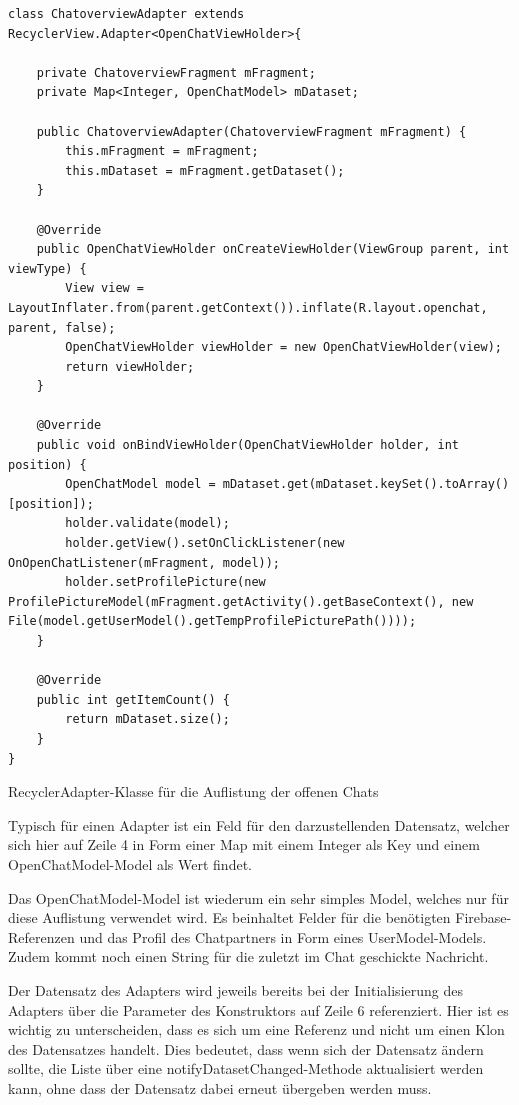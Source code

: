 \documentclass[../main.tex]{subfiles}
\begin{document}
\begin{code}
	\begin{center}
		\begin{verbatim}
class ChatoverviewAdapter extends RecyclerView.Adapter<OpenChatViewHolder>{

	private ChatoverviewFragment mFragment;
	private Map<Integer, OpenChatModel> mDataset;

	public ChatoverviewAdapter(ChatoverviewFragment mFragment) {
		this.mFragment = mFragment;
		this.mDataset = mFragment.getDataset();
	}

	@Override
	public OpenChatViewHolder onCreateViewHolder(ViewGroup parent, int viewType) {
		View view = LayoutInflater.from(parent.getContext()).inflate(R.layout.openchat, parent, false);
		OpenChatViewHolder viewHolder = new OpenChatViewHolder(view);
		return viewHolder;
	}

	@Override
	public void onBindViewHolder(OpenChatViewHolder holder, int position) {
		OpenChatModel model = mDataset.get(mDataset.keySet().toArray()[position]);
		holder.validate(model);
		holder.getView().setOnClickListener(new OnOpenChatListener(mFragment, model));
		holder.setProfilePicture(new ProfilePictureModel(mFragment.getActivity().getBaseContext(), new File(model.getUserModel().getTempProfilePicturePath())));
	}

	@Override
	public int getItemCount() {
		return mDataset.size();
	}
}
		\end{verbatim}
		\caption{RecyclerAdapter-Klasse für die Auflistung der offenen Chats}
		\label{chatOverviewAdapter}
	\end{center}
\end{code}

	Typisch für einen Adapter ist ein Feld für den darzustellenden Datensatz, welcher sich hier auf Zeile 4 in Form einer Map mit einem Integer als Key und einem OpenChatModel-Model als Wert findet. 
	
	Das OpenChatModel-Model ist wiederum ein sehr simples Model, welches nur für diese Auflistung verwendet wird. Es beinhaltet Felder für die benötigten Firebase-Referenzen und das Profil des Chatpartners in Form eines UserModel-Models. Zudem kommt noch einen String für die zuletzt im Chat geschickte Nachricht.
	
	Der Datensatz des Adapters wird jeweils bereits bei der Initialisierung des Adapters über die Parameter des Konstruktors auf Zeile 6 referenziert. Hier ist es wichtig zu unterscheiden, dass es sich um eine Referenz und nicht um einen Klon des Datensatzes handelt. Dies bedeutet, dass wenn sich der Datensatz ändern sollte, die Liste über eine notifyDatasetChanged-Methode aktualisiert werden kann, ohne dass der Datensatz dabei erneut übergeben werden muss.
	
\end{document}
